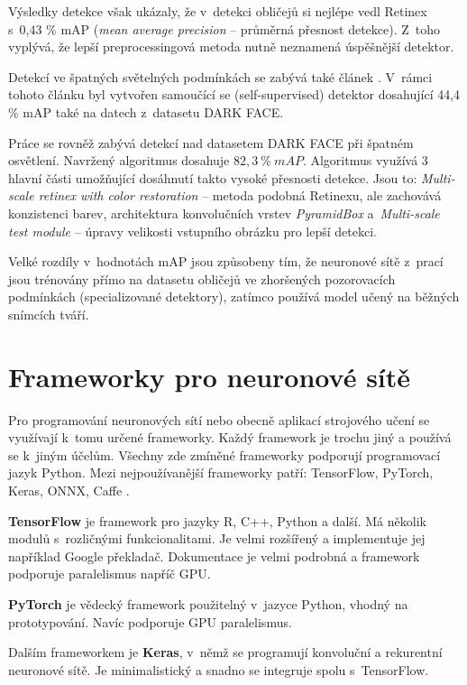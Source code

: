 Výsledky detekce však ukázaly, že v~detekci obličejů si nejlépe vedl Retinex s~0,43 \% mAP (\emph{mean average precision} -- průměrná přesnost detekce). Z~toho vyplývá, že lepší preprocessingová metoda nutně neznamená úspěšnější detektor.

Detekcí ve špatných světelných podmínkách se zabývá také článek \cite{HLAFace}. V~rámci tohoto článku byl vytvořen samoučící se (self-supervised) detektor dosahující 44,4 \% mAP také na datech z~datasetu DARK FACE.

Práce \cite{fdExtremelyLowConditions} se rovněž zabývá detekcí nad datasetem DARK FACE při špatném osvětlení. Navržený algoritmus dosahuje $82,3\:\%\:mAP$. Algoritmus využívá 3 hlavní části umožňující dosáhnutí takto vysoké přesnosti detekce. Jsou to: \emph{Multi-scale retinex with color restoration} -- metoda podobná Retinexu, ale zachovává konzistenci barev, architektura konvolučních vrstev \emph{PyramidBox} a~\emph{Multi-scale test module} -- úpravy velikosti vstupního obrázku pro lepší detekci.

Velké rozdíly v~hodnotách mAP jsou způsobeny tím, že neuronové sítě z~prací \cite{HLAFace, fdExtremelyLowConditions} jsou trénovány přímo na datasetu obličejů ve zhoršených pozorovacích podmínkách (specializované detektory), zatímco \cite{lowLightFdReview} používá model učený na běžných snímcích tváří.

\section{Frameworky pro neuronové sítě}
\label{sekce:frameworky_pro_ns}
Pro programování neuronových sítí nebo obecně aplikací strojového učení se využívají k~tomu určené frameworky. Každý framework je trochu jiný a používá se k~jiným účelům. Všechny zde zmíněné frameworky podporují programovací jazyk Python. Mezi nejpoužívanější frameworky patří: TensorFlow, PyTorch, Keras, ONNX, Caffe \cite{nsFrameworks}.

\vspace{1em}
\textbf{TensorFlow} je framework pro jazyky R, C++, Python a další. Má několik modulů s~rozličnými funkcionalitami. Je velmi rozšířený a implementuje jej například Google překladač. Dokumentace je velmi podrobná a framework podporuje paralelismus napříč GPU.

\textbf{PyTorch} je vědecký framework použitelný v~jazyce Python, vhodný na prototypování. Navíc podporuje GPU paralelismus.

Dalším frameworkem je \textbf{Keras}, v~němž se programují konvoluční a rekurentní neuronové sítě. Je minimalistický a snadno se integruje spolu s~TensorFlow.

